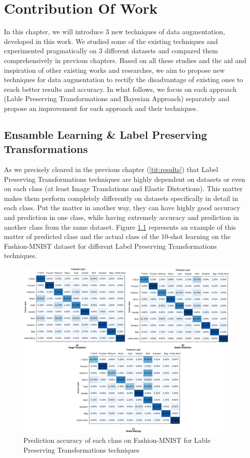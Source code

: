 \chapter{Contribution Of Work}
In this chapter, we will introduce $3$ new techniques of data augmentation, developed in this work. We studied some of the existing techniques and experimented pragmatically on $3$ different datasets and compared them comprehensively in previous chapters. Based on all these studies and the aid and inspiration of other existing works and researches, we aim to propose new techniques for data augmentation to rectify the disadvantage of existing ones to reach better results and accuracy. In what follows, we focus on each approach (Lable Preserving Transformations and Bayesian Approach) separately and propose an improvement for each approach and their techniques.

\section{Ensamble Learning \& Label Preserving Transformations}
As we precisely cleared in the previous chapter (\ref{tit:results}) that Label Preserving
Transformations techniques are highly dependent on datasets or even on each class (at least Image
Translations and Elastic Distortions). This matter makes them perform completely differently on
datasets specifically in detail in each class. Put the matter in another way, they can have highly
good accuracy and prediction in one class, while having extremely accuracy and prediction in another
class from the same dataset. Figure \ref{fig:Fashion_MNIST_Heatmaps} represents an example of this matter of predicted class
and the actual class of the 10-shot learning on the Fashion-MNIST dataset for different  Label
Preserving Transformations techniques.

\begin{figure}
  \centering
  \label{fig:Fashion_MNIST_Heatmaps}
  \includegraphics[width=1.1\textwidth]{fig/contribution/Fashion_MNIST_Heatmap}
  \caption{Prediction accuracy of each class on Fashion-MNIST for Lable Preserving Transformations techniques}
\end{figure}

